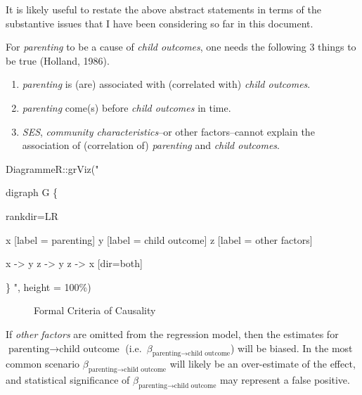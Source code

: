\documentclass[
  letterpaper,
  DIV=11,
  numbers=noendperiod]{scrreprt}
\newenvironment{Shaded}{\begin{snugshade}}{\end{snugshade}}
\newcommand{\AttributeTok}[1]{\textcolor[rgb]{0.40,0.45,0.13}{#1}}
\newcommand{\FunctionTok}[1]{\textcolor[rgb]{0.28,0.35,0.67}{#1}}
\newcommand{\NormalTok}[1]{\textcolor[rgb]{0.00,0.23,0.31}{#1}}
\newcommand{\SpecialCharTok}[1]{\textcolor[rgb]{0.37,0.37,0.37}{#1}}
\newcommand{\StringTok}[1]{\textcolor[rgb]{0.13,0.47,0.30}{#1}}
\providecommand{\tightlist}{%
  \setlength{\itemsep}{0pt}\setlength{\parskip}{0pt}}\usepackage{longtable,booktabs,array}
\begin{document}
It is likely useful to restate the above abstract statements in terms of
the substantive issues that I have been considering so far in this
document.

For \emph{parenting} to be a cause of \emph{child outcomes}, one needs
the following 3 things to be true (Holland, 1986).

\begin{enumerate}
\def\labelenumi{\arabic{enumi}.}
\tightlist
\item
  \emph{parenting} is (are) associated with (correlated with)
  \emph{child outcomes}.
\item
  \emph{parenting} come(s) before \emph{child outcomes} in time.
\item
  \emph{SES}, \emph{community characteristics}--or other factors--cannot
  explain the association of (correlation of) \emph{parenting} and
  \emph{child outcomes}.
\end{enumerate}

\begin{Shaded}
\begin{Highlighting}[]
\NormalTok{DiagrammeR}\SpecialCharTok{::}\FunctionTok{grViz}\NormalTok{(}\StringTok{"}

\StringTok{digraph G \{}

\StringTok{rankdir=\textquotesingle{}LR\textquotesingle{}}

\StringTok{x [label = \textquotesingle{}parenting\textquotesingle{}]}
\StringTok{y [label = \textquotesingle{}child outcome\textquotesingle{}]}
\StringTok{z [label = \textquotesingle{}other factors\textquotesingle{}]}

\StringTok{x {-}\textgreater{} y}
\StringTok{z {-}\textgreater{} y}
\StringTok{z {-}\textgreater{} x [dir=\textquotesingle{}both\textquotesingle{}]}

\StringTok{\} }
\StringTok{"}\NormalTok{, }\AttributeTok{height =} \StringTok{\textquotesingle{}100\%\textquotesingle{}}\NormalTok{)}
\end{Highlighting}
\end{Shaded}

\begin{figure}

{\centering 

}

\caption{\label{fig-causalitysubstantive}Formal Criteria of Causality}

\end{figure}

If \emph{other factors} are omitted from the regression model, then the
estimates for \(\text{parenting} \rightarrow \text{child outcome}\)
(i.e.~\(\beta_{\text{parenting} \rightarrow \text{child outcome}}\))
will be biased. In the most common scenario
\(\beta_{\text{parenting} \rightarrow \text{child outcome}}\) will
likely be an over-estimate of the effect, and statistical significance
of \(\beta_{\text{parenting} \rightarrow \text{child outcome}}\) may
represent a false positive.
\end{document}
